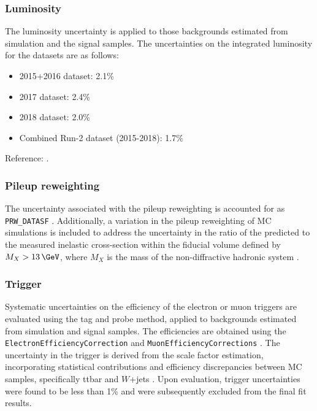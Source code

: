 \clearpage
\subsubsection*{Luminosity}
The luminosity uncertainty is applied to those backgrounds estimated from simulation and the signal samples.
The uncertainties on the integrated luminosity for the datasets are as follows:
\begin{itemize}
    \item 2015+2016 dataset: 2.1\%
    \item 2017 dataset: 2.4\%
    \item 2018 dataset: 2.0\%
    \item Combined Run-2 dataset (2015-2018): 1.7\%
\end{itemize}
Reference: \cite{AtlasLumiRun2}.


\subsubsection*{Pileup reweighting}
The uncertainty associated with the pileup reweighting is accounted for as \texttt{PRW\_DATASF} \cite{ExtendedPileupReweighting}. 
Additionally, a variation in the pileup reweighting of MC simulations is included to address the uncertainty in the ratio of the predicted to the measured inelastic cross-section within the fiducial volume defined by $M_X > 13\,\GeV$, where $M_X$ is the mass of the non-diffractive hadronic system \cite{STDM-2015-05}.



\subsubsection*{Trigger}
Systematic uncertainties on the efficiency of the electron or muon triggers are evaluated using the tag and probe method, applied to backgrounds estimated from simulation and signal samples. 
The efficiencies are obtained using the \texttt{ElectronEfficiencyCorrection} \cite{AsgElectronEfficiencyCorrectionTool} and \texttt{MuonEfficiencyCorrections} \cite{TrigMuonEfficiency}. The uncertainty in the \met trigger is derived from the scale factor estimation, incorporating statistical contributions and efficiency discrepancies between MC samples, specifically ttbar and $W$+jets \cite{ATLAS-CONF-2016-091, Masubuchi:2151844}. Upon evaluation, trigger uncertainties were found to be less than 1\% and were subsequently excluded from the final fit results.


